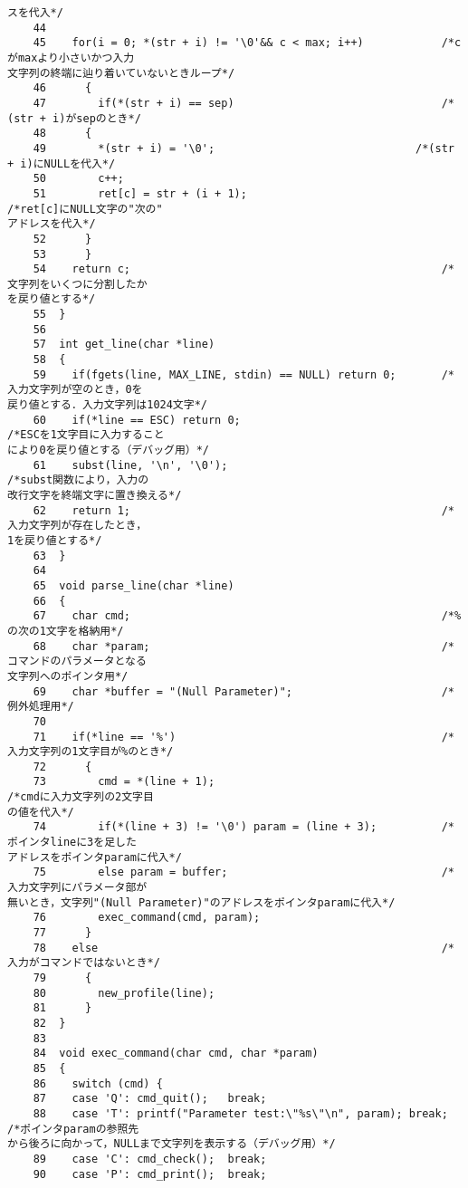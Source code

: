 \begin{Verbatim}[fontsize=\small, baselinestretch=0.8]
スを代入*/
    44	
    45	  for(i = 0; *(str + i) != '\0'&& c < max; i++)            /*cがmaxより小さいかつ入力
文字列の終端に辿り着いていないときループ*/
    46	    {
    47	      if(*(str + i) == sep)                                /*(str + i)がsepのとき*/
    48		{
    49		  *(str + i) = '\0';                               /*(str + i)にNULLを代入*/
    50		  c++;
    51		  ret[c] = str + (i + 1);                          /*ret[c]にNULL文字の"次の"
アドレスを代入*/
    52		}
    53	    }
    54	  return c;                                                /*文字列をいくつに分割したか
を戻り値とする*/
    55	}
    56	
    57	int get_line(char *line)
    58	{
    59	  if(fgets(line, MAX_LINE, stdin) == NULL) return 0;       /*入力文字列が空のとき，0を
戻り値とする．入力文字列は1024文字*/
    60	  if(*line == ESC) return 0;                               /*ESCを1文字目に入力すること
により0を戻り値とする（デバッグ用）*/
    61	  subst(line, '\n', '\0');                                 /*subst関数により，入力の
改行文字を終端文字に置き換える*/
    62	  return 1;                                                /*入力文字列が存在したとき，
1を戻り値とする*/
    63	}
    64	
    65	void parse_line(char *line)
    66	{
    67	  char cmd;                                                /*%の次の1文字を格納用*/
    68	  char *param;                                             /*コマンドのパラメータとなる
文字列へのポインタ用*/
    69	  char *buffer = "(Null Parameter)";                       /*例外処理用*/
    70	
    71	  if(*line == '%')                                         /*入力文字列の1文字目が%のとき*/
    72	    {
    73	      cmd = *(line + 1);                                   /*cmdに入力文字列の2文字目
の値を代入*/
    74	      if(*(line + 3) != '\0') param = (line + 3);          /*ポインタlineに3を足した
アドレスをポインタparamに代入*/
    75	      else param = buffer;                                 /*入力文字列にパラメータ部が
無いとき，文字列"(Null Parameter)"のアドレスをポインタparamに代入*/
    76	      exec_command(cmd, param);
    77	    }
    78	  else                                                     /*入力がコマンドではないとき*/
    79	    {
    80	      new_profile(line);
    81	    }
    82	}
    83	
    84	void exec_command(char cmd, char *param)
    85	{
    86	  switch (cmd) {
    87	  case 'Q': cmd_quit();   break;
    88	  case 'T': printf("Parameter test:\"%s\"\n", param); break;   /*ポインタparamの参照先
から後ろに向かって，NULLまで文字列を表示する（デバッグ用）*/
    89	  case 'C': cmd_check();  break;
    90	  case 'P': cmd_print();  break;

\end{Verbatim}
